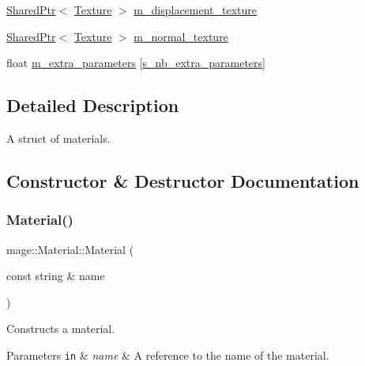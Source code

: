 \begin{DoxyCompactItemize}
\item 
\hyperlink{namespacemage_a1e01ae66713838a7a67d30e44c67703e}{Shared\+Ptr}$<$ \hyperlink{classmage_1_1_texture}{Texture} $>$ \hyperlink{structmage_1_1_material_a04ca0a2efe12529ae0ea91e9cb622ade}{m\+\_\+displacement\+\_\+texture}
\item 
\hyperlink{namespacemage_a1e01ae66713838a7a67d30e44c67703e}{Shared\+Ptr}$<$ \hyperlink{classmage_1_1_texture}{Texture} $>$ \hyperlink{structmage_1_1_material_a18e56785d5ca3ae5a9b99c64e70622d6}{m\+\_\+normal\+\_\+texture}
\item 
float \hyperlink{structmage_1_1_material_a8b16f762a4bbfb99b98a884d7b4dcee0}{m\+\_\+extra\+\_\+parameters} \mbox{[}\hyperlink{structmage_1_1_material_ab8d10c2cb8ab77bee18654e63acaa63a}{s\+\_\+nb\+\_\+extra\+\_\+parameters}\mbox{]}
\end{DoxyCompactItemize}


\subsection{Detailed Description}
A struct of materials. 

\subsection{Constructor \& Destructor Documentation}
\hypertarget{structmage_1_1_material_a0307d3bcf53c6ba270c8be4d127298db}{}\label{structmage_1_1_material_a0307d3bcf53c6ba270c8be4d127298db} 
\subsubsection{\texorpdfstring{Material()}{Material()}\hspace{0.1cm}{\footnotesize\ttfamily [1/3]}}
{\footnotesize\ttfamily mage\+::\+Material\+::\+Material (\begin{DoxyParamCaption}\item[{const string \&}]{name }\end{DoxyParamCaption})\hspace{0.3cm}{\ttfamily [explicit]}}

Constructs a material.


\begin{DoxyParams}[1]{Parameters}
\mbox{\tt in}  & {\em name} & A reference to the name of the material. \\
\hline
\end{DoxyParams}
\hypertarget{structmage_1_1_material_abed630412cdc4a6281389d128ec4b5f3}{}\label{structmage_1_1_material_abed630412cdc4a6281389d128ec4b5f3} 
